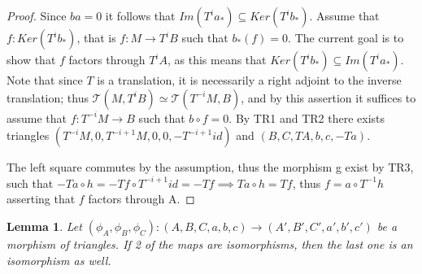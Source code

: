 \documentclass[12pt]{article}
\newtheorem{lemma}[theorem]{Lemma}
\theoremstyle{definition}
\theoremstyle{remark}
\begin{document}
\begin{proof}
                Since $ba=0$ it follows that $Im(T^ia_*) \subseteq Ker(T^ib_*)$. Assume that $f:Ker(T^ib_*)$, that is $f:M\rightarrow T^iB$ such that $b_*(f)=0$. The current goal is to show that $f$ factors through $T^iA$, as this means that $Ker(T^ib_*)\subseteq Im(T^ia_*)$. Note that since $T$ is a translation, it is necessarily a right adjoint to the inverse translation; thus $\mathcal{T}(M,T^iB) \simeq\mathcal{T}(T^{-i}M,B)$, and by this assertion it suffices to assume that $f:T^{-i}M\rightarrow B$ such that $b\circ f = 0$. By TR1 and TR2 there exists triangles $(T^{-i}M,0,T^{-i+1}M,0,0,-T^{-i+1}id)$ and $(B,C,TA,b,c,-Ta)$. 
                \begin{center}
                \end{center}
                The left square commutes by the assumption, thus the morphism g exist by TR3, such that $-Ta\circ h = -Tf\circ T^{-i+1}id = -Tf \implies Ta\circ h = Tf$, thus $f = a\circ T^{-1}h$ asserting that $f$ factors through A.
            \end{proof}
            \begin{lemma}
                Let $(\phi_A, \phi_B, \phi_C):(A,B,C,a,b,c) \rightarrow (A',B',C',a',b',c')$ be a morphism of triangles. If 2 of the maps are isomorphisms, then the last one is an isomorphism as well.
                \begin{center}
                \end{center}
            \end{lemma}
\end{document}
